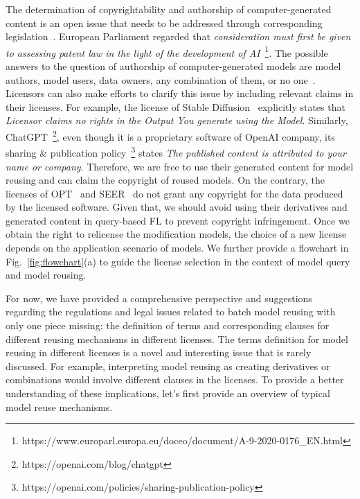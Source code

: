 The determination of copyrightability and authorship of computer-generated content is an open issue that needs to be addressed through corresponding legislation~\cite{national1979final, hedrick2019ithink, margoni2018artificial}.
European Parliament regarded that \textit{consideration must first be given to assessing patent law in the light of the development of AI}~\footnote{https://www.europarl.europa.eu/doceo/document/A-9-2020-0176\_EN.html}.
The possible answers to the question of authorship of computer-generated models are model authors, model users, data owners, any combination of them, or no one~\cite{hedrick2019ithink}.
Licensors can also make efforts to clarify this issue by including relevant claims in their licenses.
For example, the license of Stable Diffusion~\cite{rombach2022high} explicitly states that \textit{Licensor claims no rights in the Output You generate using the Model}. 
Similarly, ChatGPT~\footnote{https://openai.com/blog/chatgpt}, even though it is a proprietary software of OpenAI company, its sharing \& publication policy~\footnote{https://openai.com/policies/sharing-publication-policy} states \textit{The published content is attributed to your name or company}.
Therefore, we are free to use their generated content for model reusing and can claim the copyright of reused models.
On the contrary, the licenses of OPT~\cite{zhang2022opt} and SEER~\cite{goyal2022vision} do not grant any copyright for the data produced by the licensed software. 
Given that, we should avoid using their derivatives and generated content in query-based FL to prevent copyright infringement.
Once we obtain the right to relicense the modification models, the choice of a new license depends on the application scenario of models. 
We further provide a flowchart in Fig.~\ref{fig:flowchart}(a) to guide the license selection in the context of model query and model reusing.

For now, we have provided a comprehensive perspective and suggestions regarding the regulations and legal issues related to batch model reusing with only one piece missing: the definition of terms and corresponding clauses for different reusing mechanisms in different licenses.
The terms definition for model reusing in different licenses is a novel and interesting issue that is rarely discussed. 
For example, interpreting model reusing as creating derivatives or combinations would involve different clauses in the licenses.
To provide a better understanding of these implications, let's first provide an overview of typical model reuse mechanisms.

